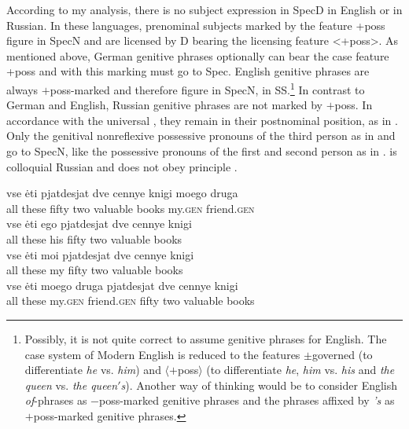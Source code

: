 \documentclass[output=paper,colorlinks,citecolor=brown]{langscibook}
\begin{document}
\noindent According to my analysis, there is no subject expression in SpecD in English or in Russian. In these languages, prenominal subjects marked by the feature +poss figure in SpecN and are licensed by D bearing the licensing feature <+poss>. As mentioned above, German genitive phrases optionally can bear the case feature +poss and with this marking must go to Spec. English genitive phrases are always $+$poss-marked and therefore figure in SpecN, in SS.\footnote{Possibly, it is not quite correct to assume genitive phrases for English. The case system of Modern English is reduced to the features $\pm$governed (to differentiate \textit{he} vs. \textit{him}) and $\langle +$poss$\rangle$ (to differentiate \textit{he}, \textit{him} vs. \textit{his} and \textit{the queen} vs. \textit{the queen$'$s}). Another way of thinking would be to consider English \textit{of}-phrases as $-$poss-marked genitive phrases and the phrases affixed by \textit{'s} as $+$poss-marked genitive phrases.} In contrast to German and English, Russian genitive phrases are not marked by $+$poss. In accordance with the universal , they remain in their postnominal position, as in . Only the genitival nonreflexive possessive pronouns of the third person as in  and  go to SpecN, like the possessive pronouns of the first and second person as in .  is colloquial Russian and does not obey principle .

\ea \label{ex:zi91:62}
    \ea \label{ex:zi91:62a}
        \gll vse {\.e}ti pjatdesjat dve cennye knigi moego druga \\
        all these fifty two valuable books my.\textsc{gen} friend.\textsc{gen} \\
        \glt
    \ex \label{ex:zi91:62b}
        \gll vse {\.e}ti ego pjatdesjat dve cennye knigi \\
        all these his fifty two valuable books \\
        \glt 
    \ex \label{ex:zi91:62c}
        \gll vse {\.e}ti moi pjatdesjat dve cennye knigi \\
        all these my fifty two valuable books \\
        \glt 
    \ex \label{ex:zi91:62d}
        \gll vse {\.e}ti moego druga pjatdesjat dve cennye knigi \\
        all these my.\textsc{gen} friend.\textsc{gen} fifty two valuable books \\
        \glt
    \z
\z
\end{document}
